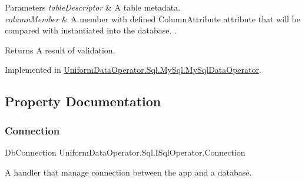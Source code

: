 \begin{DoxyParams}{Parameters}
{\em table\+Descriptor} & A table metadata.\\
\hline
{\em column\+Member} & A member with defined Column\+Attribute attribute that will be compared with instantiated into the database. . \\
\hline
\end{DoxyParams}
\begin{DoxyReturn}{Returns}
A result of validation.
\end{DoxyReturn}


Implemented in \mbox{\hyperlink{class_uniform_data_operator_1_1_sql_1_1_my_sql_1_1_my_sql_data_operator_a3c1a7ceec19175ba5bbce8109565be05}{Uniform\+Data\+Operator.\+Sql.\+My\+Sql.\+My\+Sql\+Data\+Operator}}.



\subsection{Property Documentation}
\mbox{\label{interface_uniform_data_operator_1_1_sql_1_1_i_sql_operator_a99f034a986828e96955e3187cdfb28da}} 
\subsubsection{\texorpdfstring{Connection}{Connection}}
{\footnotesize\ttfamily Db\+Connection Uniform\+Data\+Operator.\+Sql.\+I\+Sql\+Operator.\+Connection\hspace{0.3cm}{\ttfamily [get]}}



A handler that manage connection between the app and a database. 

\mbox{\label{interface_uniform_data_operator_1_1_sql_1_1_i_sql_operator_a55b7f28ed4ab20f124e67e2d447f8b40}} 
